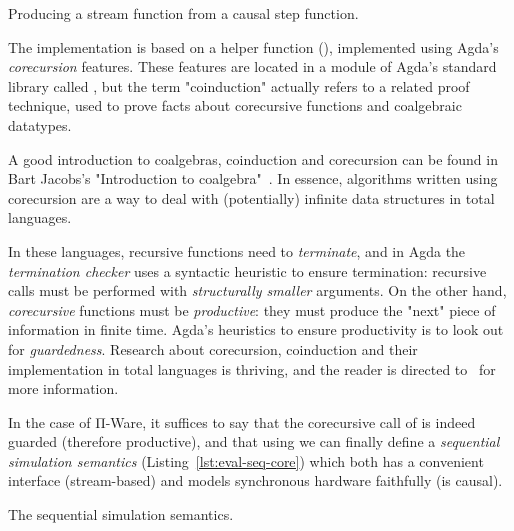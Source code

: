             \begin{listing}[h]
                \caption{Producing a stream function from a causal step function.\label{lst:run-causal}}
            \end{listing}

            The implementation is based on a helper function (),
            implemented using Agda's \emph{corecursion} features.
            These features are located in a module of Agda's standard library called ,
            but the term "coinduction" actually refers to a related proof technique,
            used to prove facts about corecursive functions and coalgebraic datatypes.

            A good introduction to coalgebras, coinduction and corecursion can be found in
            Bart Jacobs's "Introduction to coalgebra"~\cite{introduction-coalgebra-jacobs}.
            In essence, algorithms written using corecursion are a way to deal with (potentially) infinite
            data structures in total languages.

            In these languages, recursive functions need to \emph{terminate},
            and in Agda the \emph{termination checker} uses a syntactic heuristic to ensure termination:
            recursive calls must be performed with \emph{structurally smaller} arguments.
            On the other hand, \emph{corecursive} functions must be \emph{productive}:
            they must produce the "next" piece of information in finite time.
            Agda's heuristics to ensure productivity is to look out for \emph{guardedness}.
            Research about corecursion, coinduction and their implementation in total languages is thriving,
            and the reader is directed to~\cite{coinductive-inductive-termination} for more information.

            In the case of Π-Ware, it suffices to say that the corecursive call of 
            is indeed guarded (therefore productive), and that using  we can finally define
            a \emph{sequential simulation semantics} (Listing~\ref{lst:eval-seq-core}) which both
            has a convenient interface (stream-based) and models synchronous hardware faithfully (is causal).

            \begin{listing}[h]
                \caption{The sequential simulation semantics.\label{lst:eval-seq-core}}
            \end{listing}


